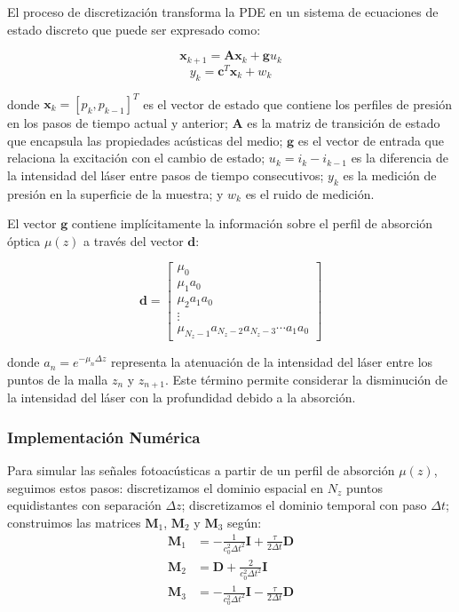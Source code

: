 El proceso de discretización transforma la PDE en un sistema de ecuaciones de estado discreto que puede ser expresado como:

\begin{equation}
    \mathbf{x}_{k+1} = \mathbf{A}\mathbf{x}_k + \mathbf{g}u_k
\end{equation}
\begin{equation}
    y_k = \mathbf{c}^T\mathbf{x}_k + w_k
\end{equation}

donde $\mathbf{x}_k = [p_k, p_{k-1}]^T$ es el vector de estado que contiene los perfiles de presión en los pasos de tiempo actual y anterior; $\mathbf{A}$ es la matriz de transición de estado que encapsula las propiedades acústicas del medio; $\mathbf{g}$ es el vector de entrada que relaciona la excitación con el cambio de estado; $u_k = i_k - i_{k-1}$ es la diferencia de la intensidad del láser entre pasos de tiempo consecutivos; $y_k$ es la medición de presión en la superficie de la muestra; y $w_k$ es el ruido de medición.

El vector $\mathbf{g}$ contiene implícitamente la información sobre el perfil de absorción óptica $\mu(z)$ a través del vector $\mathbf{d}$:

\begin{equation}
    \mathbf{d} = \begin{bmatrix} 
    \mu_0 \\ 
    \mu_1 a_0 \\ 
    \mu_2 a_1 a_0 \\ 
    \vdots \\ 
    \mu_{N_z-1} a_{N_z-2} a_{N_z-3} \cdots a_1 a_0 
    \end{bmatrix}
\end{equation}

donde $a_n = e^{-\mu_n \Delta z}$ representa la atenuación de la intensidad del láser entre los puntos de la malla $z_n$ y $z_{n+1}$. Este término permite considerar la disminución de la intensidad del láser con la profundidad debido a la absorción.

\subsubsection{Implementación Numérica}

Para simular las señales fotoacústicas a partir de un perfil de absorción $\mu(z)$, seguimos estos pasos: discretizamos el dominio espacial en $N_z$ puntos equidistantes con separación $\Delta z$; discretizamos el dominio temporal con paso $\Delta t$; construimos las matrices $\mathbf{M}_1$, $\mathbf{M}_2$ y $\mathbf{M}_3$ según:
\begin{align}
    \mathbf{M}_1 &= -\frac{1}{c_0^2 \Delta t^2}\mathbf{I} + \frac{\tau}{2\Delta t}\mathbf{D}\\
    \mathbf{M}_2 &= \mathbf{D} + \frac{2}{c_0^2 \Delta t^2}\mathbf{I}\\
    \mathbf{M}_3 &= -\frac{1}{c_0^2 \Delta t^2}\mathbf{I} - \frac{\tau}{2\Delta t}\mathbf{D}
\end{align}

